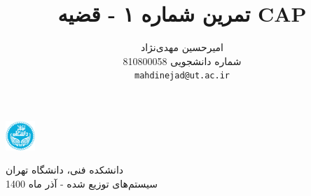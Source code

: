 \documentclass{article}
\title{تمرین شماره ۱ - قضیه CAP}
\author{%
  امیرحسین مهدی‌نژاد\\
  شماره دانشجویی 810800058\\
  \texttt{mahdinejad@ut.ac.ir} \\
}
\begin{document}
\begin{minipage}{0.1\textwidth}%
\includegraphics[width=1.1cm]{Photos/UT_logo.png}
\end{minipage}%
\hfill%
\begin{minipage}{0.9\textwidth}\raggedleft
دانشکده فنی، دانشگاه تهران\\
سیستم‌های توزیع شده - 
آذر
ماه 1400\\
\end{minipage}


\makepertitle


\end{document}
